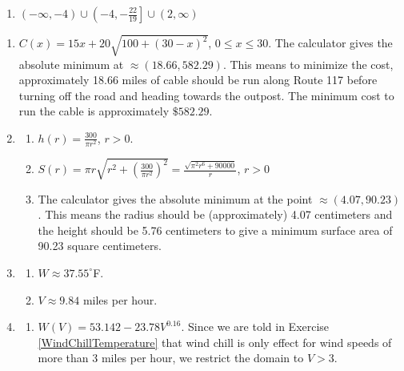 \begin{enumerate}
\setcounter{enumi}{\value{HW}}

\item $(-\infty, -4) \cup \left(-4, -\frac{22}{19}\right] \cup (2, \infty)$

\setcounter{HW}{\value{enumi}}
\end{enumerate}

\begin{enumerate}
\setcounter{enumi}{\value{HW}}

\item $C(x) = 15x+20\sqrt{100+(30-x)^2}$, $0 \leq x \leq 30$.  The calculator gives the absolute minimum at $\approx (18.66, 582.29)$.  This means to minimize the cost, approximately 18.66 miles of cable should be run along Route 117 before turning off the road and heading towards the outpost.  The minimum cost to run the cable is approximately $\$582.29$.



\item 

\begin{enumerate}
\item  $h(r) = \frac{300}{\pi r^2}$, $r > 0$.
\item  $S(r) = \pi r \sqrt{r^2+\left(\frac{300}{\pi r^2}\right)^2} = \frac{\sqrt{\pi^2 r^6+90000}}{r}$, $r>0$
\item  The calculator gives the absolute minimum at the point $\approx (4.07, 90.23)$.  This means the radius should be (approximately) 4.07 centimeters and the height should be 5.76 centimeters to give a minimum surface area of 90.23 square centimeters.


\end{enumerate}

\item

\begin{enumerate}

\item  $W \approx 37.55^{\circ}$F.

\item  $V \approx 9.84$ miles per hour.

\end{enumerate}

\item 

\begin{enumerate}

\item $W(V) = 53.142 - 23.78 V^{0.16}$.  Since we are told in Exercise \ref{WindChillTemperature} that wind chill is only effect for wind speeds of more than 3 miles per hour, we restrict the domain to $V > 3$.


\end{enumerate}
\end{enumerate}
